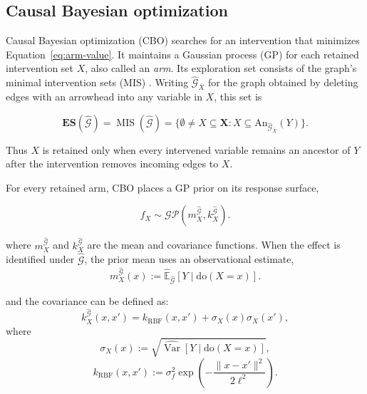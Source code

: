 \documentclass[twoside]{article}
\newcommand{\E}{\mathbb{E}}
\newcommand{\doo}{\mathrm{do}}
\newcommand{\An}{\mathrm{An}}
\newcommand{\CBO}{\textsc{CBO}}
\newcommand{\Gg}{\mathcal{G}}
\newcommand{\ES}{\mathbf{ES}}
\begin{document}
\subsection{Causal Bayesian optimization}

Causal Bayesian optimization (\CBO{}) \citep{agliettiCausalBayesianOptimization2020b} searches for an intervention that minimizes Equation~\eqref{eq:arm-value}. It maintains a Gaussian process (GP) for each retained intervention set $X$, also called an \emph{arm}. Its exploration set consists of the graph's minimal intervention sets (MIS) \citep{lee2018structural,agliettiCausalBayesianOptimization2020b}. Writing \(\widehat{\Gg}_{\bar X}\) for the graph obtained by deleting edges with an arrowhead into any variable in \(X\), this set is

\begin{equation}
\ES(\widehat{\Gg})=\operatorname{MIS}(\widehat{\Gg})
=\{\emptyset\ne X\subseteq\mathbf X:
X\subseteq\An_{\widehat{\Gg}_{\bar X}}(Y)\}.
\label{eq:mis}
\end{equation}

Thus \(X\) is retained only when every intervened variable remains an ancestor of \(Y\) after the intervention removes incoming edges to \(X\).

For every retained arm, CBO places a GP prior on its response surface,

\begin{equation}
f_X\sim\mathcal{GP}(m_X^{\widehat{\Gg}},k_X^{\widehat{\Gg}}).
\label{eq:cbo-gp}
\end{equation}

where \(m_X^{\widehat{\Gg}}\) and \(k_X^{\widehat{\Gg}}\) are the mean and covariance functions. When the effect is identified under \(\widehat{\Gg}\), the prior mean uses an observational estimate,
\begin{equation}
  m_X^{\widehat{\mathcal G}}(x)
  :=
  \widehat{\E}_{\widehat{\mathcal G}}\!\left[Y\mid\doo(X=x)\right].
  \label{eq:causal-prior}
\end{equation}

and the covariance can be defined as:
\begin{equation}
k_X^{\widehat{\Gg}}(x,x')
=
k_{\mathrm{RBF}}(x,x')
+
\sigma_X(x)\sigma_X(x'),
\label{eq:causal-kernel}
\end{equation}
where
\[
\sigma_X(x)
:=
\sqrt{\widehat{\operatorname{Var}}
       [Y\mid\doo(X=x)]},
\]
\[
k_{\mathrm{RBF}}(x,x')
:=
\sigma_f^2
\exp\!\left(-\frac{\lVert x-x'\rVert^2}{2\ell^2}\right).
\]
\end{document}
